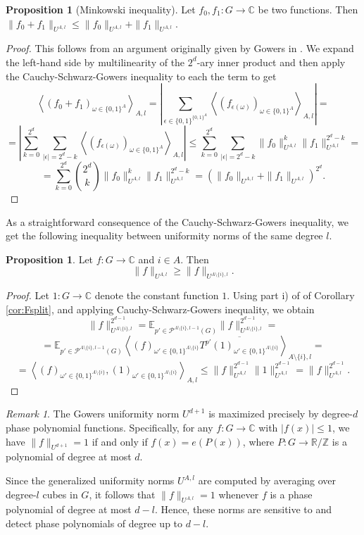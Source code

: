 \documentclass{amsart}
\theoremstyle{definition}
\newtheorem{proposition}[theorem]{Proposition}
\theoremstyle{remark}
\newtheorem{remark}[theorem]{Remark}
\numberwithin{equation}{section}
\begin{document}
\begin{proposition}[Minkowski inequality]  Let $f_0,f_1 : G \to \mathbb{C}$ be two functions. Then $ \|f_0+f_1\|_{U^{A,l}} \le  \|f_0\|_{U^{A,l}} +  \|f_1\|_{U^{A,l}}$.  
\end{proposition}
\begin{proof}
This follows from an argument originally given by  Gowers in \cite{Gow01}. We expand   the left-hand side   by  multilinearity of the $2^d$-ary inner product and then apply the Cauchy-Schwarz-Gowers inequality to each the term to get
$$\left\langle (f_0+ f_1)_{\omega \in \{0,1\}^A}  \right\rangle_{A,l} = \left|\sum_{\epsilon \in \{0,1\}^{\{0,1\}^A}} \left\langle (f_{\epsilon(\omega)})_{\omega \in \{0,1\}^A}  \right\rangle_{A,l}\right|= $$
$$=\left|\sum_{k=0}^{2^d}\sum_{|\epsilon|=2^d-k} \left\langle (f_{\epsilon(\omega)})_{\omega \in \{0,1\}^A}  \right\rangle_{A,l}\right|\le \sum_{k=0}^{2^d}\sum_{|\epsilon|=2^d-k} \|f_0\|_{U^{A,l}}^{k}\|f_1\|_{U^{A,l}}^{2^d -k}=$$
$$
= \sum_{k=0}^{2^d} \binom{2^d}{k} \|f_0\|_{U^{A,l}}^{k}\|f_1\|_{U^{A,l}}^{2^d -k}
=( \|f_0\|_{U^{A,l}}+\|f_1\|_{U^{A,l}})^{2^d}.$$
\end{proof}

As a straightforward consequence of the Cauchy-Schwarz-Gowers inequality, we get the following inequality between uniformity norms of the same degree $l$.

\begin{proposition}
    Let  $f: G \to \mathbb{C}$ and $i \in A$. Then \[\|f\|_{U^{A,l}} \ge \|f\|_{U^{A \setminus \{i\},l}}.\]
\end{proposition} 
\begin{proof} Let $1:G \to \mathbb{C}$ denote the constant function $1$. Using part i) of of Corollary \ref{cor:Fsplit}, and applying Cauchy-Schwarz-Gowers inequality, we obtain 
\[ \|f\|_{U^{A \setminus \{i\},l}}^{2^{d-1}} = \mathbb{E}_{p' \in \mathcal{P}^{A \setminus \{i\},l-1}(G)} \|f\|_{U^{A \setminus \{i\},l}}^{2^{d-1}} = \]
\[=
\mathbb{E}_{p' \in \mathcal{P}^{A \setminus \{i\},l-1}(G)} \left\langle   (f)_{\omega' \in  \{0,1\}^{A\setminus\{i\} }} \overline{T^{p'}(1)_{\omega' \in  \{0,1\}^{A\setminus\{i\} }}}  \right\rangle_{A\setminus\{i\},l} = \]
\[  = 
\left\langle  \left(f\right)_{\omega' \in  \{0,1\}^{A\setminus\{i\} }}  ,\left(1\right)_{\omega' \in  \{0,1\}^{A\setminus\{i\} }} \right\rangle_{A,l} \le \|f\|_{U^{A ,l}}^{2^{d-1}} \|1\|_{U^{A,l}}^{2^{d-1}} = \|f\|_{U^{A ,l}}^{2^{d-1}}.
\]
\end{proof}

\begin{remark} The Gowers uniformity norm $U^{d+1}$ is maximized precisely by degree-$d$ phase polynomial functions. Specifically, for any $f:G \to \mathbb{C}$ with $|f(x)| \le 1$, we have $\|f\|_{U^{d+1}}=1$ if and only if $f(x)=e(P(x))$, where $P: G \to \mathbb{R}/\mathbb{Z}$ is a polynomial of degree at most $d$. 

Since the generalized uniformity norms \( U^{A,l} \) are computed by averaging over degree-\( l \) cubes in \( G \), it follows that \( \|f\|_{U^{A,l}} = 1 \) whenever \( f \) is a phase polynomial of degree at most \( d - l \). Hence, these norms are sensitive to and detect phase polynomials of degree up to $d - l$.
\end{remark}
\end{document}
